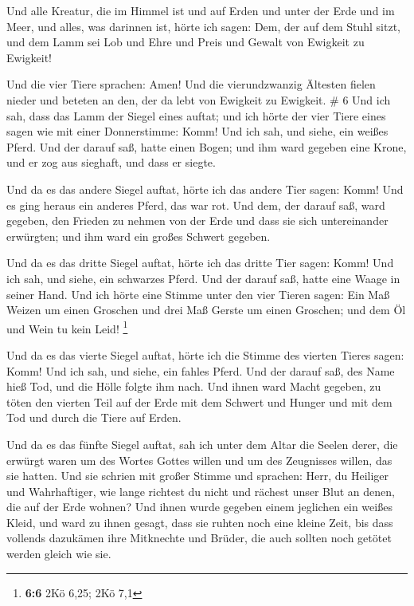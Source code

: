 Und alle Kreatur, die im Himmel ist und auf Erden und
unter der Erde und im Meer, und alles, was darinnen ist, hörte ich
sagen: Dem, der auf dem Stuhl sitzt, und dem Lamm sei Lob und Ehre und
Preis und Gewalt von Ewigkeit zu Ewigkeit!

 Und die vier Tiere sprachen: Amen! Und die
vierundzwanzig Ältesten fielen nieder und beteten an den, der da lebt
von Ewigkeit zu Ewigkeit. \# 6  Und ich sah, dass das Lamm
der Siegel eines auftat; und ich hörte der vier Tiere eines sagen wie
mit einer Donnerstimme: Komm!  Und ich sah, und siehe, ein
weißes Pferd. Und der darauf saß, hatte einen Bogen; und ihm ward
gegeben eine Krone, und er zog aus sieghaft, und dass er siegte.

 Und da es das andere Siegel auftat, hörte ich das andere
Tier sagen: Komm!  Und es ging heraus ein anderes Pferd,
das war rot. Und dem, der darauf saß, ward gegeben, den Frieden zu
nehmen von der Erde und dass sie sich untereinander erwürgten; und ihm
ward ein großes Schwert gegeben.

 Und da es das dritte Siegel auftat, hörte ich das dritte
Tier sagen: Komm! Und ich sah, und siehe, ein schwarzes Pferd. Und der
darauf saß, hatte eine Waage in seiner Hand.  Und ich
hörte eine Stimme unter den vier Tieren sagen: Ein Maß Weizen um einen
Groschen und drei Maß Gerste um einen Groschen; und dem Öl und Wein tu
kein Leid! \footnote{\textbf{6:6} 2Kö 6,25; 2Kö 7,1}

 Und da es das vierte Siegel auftat, hörte ich die Stimme
des vierten Tieres sagen: Komm!  Und ich sah, und siehe,
ein fahles Pferd. Und der darauf saß, des Name hieß Tod, und die Hölle
folgte ihm nach. Und ihnen ward Macht gegeben, zu töten den vierten Teil
auf der Erde mit dem Schwert und Hunger und mit dem Tod und durch die
Tiere auf Erden.

 Und da es das fünfte Siegel auftat, sah ich unter dem
Altar die Seelen derer, die erwürgt waren um des Wortes Gottes willen
und um des Zeugnisses willen, das sie hatten.  Und sie
schrien mit großer Stimme und sprachen: Herr, du Heiliger und
Wahrhaftiger, wie lange richtest du nicht und rächest unser Blut an
denen, die auf der Erde wohnen?  Und ihnen wurde gegeben
einem jeglichen ein weißes Kleid, und ward zu ihnen gesagt, dass sie
ruhten noch eine kleine Zeit, bis dass vollends dazukämen ihre
Mitknechte und Brüder, die auch sollten noch getötet werden gleich wie
sie.

